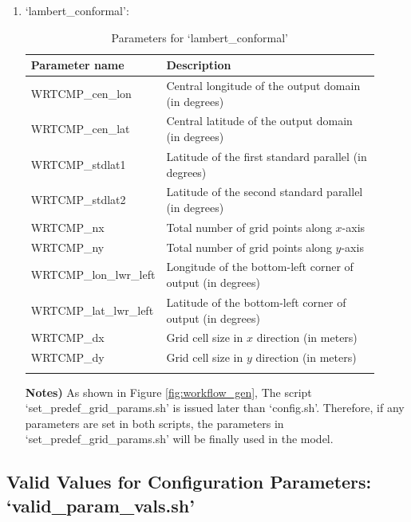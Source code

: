 \documentclass[11pt,fleqn]{report}              %
\begin{document}
\begin{enumerate}
\begin{enumerate}
\item `lambert\_conformal':
{
\fontsize{10}{12}\selectfont
\begin{longtable}{ p{0.26\linewidth} | p{0.65\linewidth}   }
\hline
\hline
 Parameter name & Description  \\
\hline
 WRTCMP\_cen\_lon & Central longitude of the output domain (in degrees)  \\
 WRTCMP\_cen\_lat & Central latitude of the output domain (in degrees) \\
 WRTCMP\_stdlat1 & Latitude of the first standard parallel (in degrees) \\
 WRTCMP\_stdlat2 & Latitude of the second standard parallel (in degrees) \\
 WRTCMP\_nx & Total number of grid points along $x$-axis \\
 WRTCMP\_ny & Total number of grid points along $y$-axis  \\
 WRTCMP\_lon\_lwr\_left & Longitude of the bottom-left corner of output (in degrees) \\
 WRTCMP\_lat\_lwr\_left & Latitude of the bottom-left corner of output (in degrees) \\
 WRTCMP\_dx & Grid cell size in $x$ direction (in meters) \\
 WRTCMP\_dy & Grid cell size in $y$ direction (in meters) \\
\hline
\caption{Parameters for `lambert\_conformal'}
\label{table:gridpara_lambert}
\end{longtable}
}

{\bf Notes)} As shown in Figure \ref{fig:workflow_gen}, The script `set\_predef\_grid\_params.sh' is issued later than `config.sh'. Therefore, if any parameters are set in both scripts, the parameters in `set\_predef\_grid\_params.sh' will be finally used in the model.

\end{enumerate}

\end{enumerate}



\subsection{Valid Values for Configuration Parameters: `valid\_param\_vals.sh'}
\label{subsec:wflow_valid_val}
\end{document}
